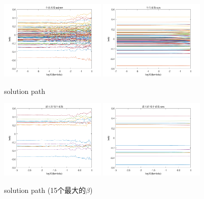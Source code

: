 \documentclass[UTF8]{ctexart}
\begin{document}
\begin{figure}[H]
  \centering
  \includegraphics[width=0.45\textwidth]{admm5000.png}
  \includegraphics[width=0.45\textwidth]{cvx5000.png}
  \caption{solution path}\label{5000}
\end{figure}
  \begin{figure}[H]
  \centering
  \includegraphics[width=0.45\textwidth]{admm15.png}
  \includegraphics[width=0.45\textwidth]{cvx15.png}
  \caption{solution path (15个最大的$\beta$)}\label{15}
\end{figure}
\end{document}
